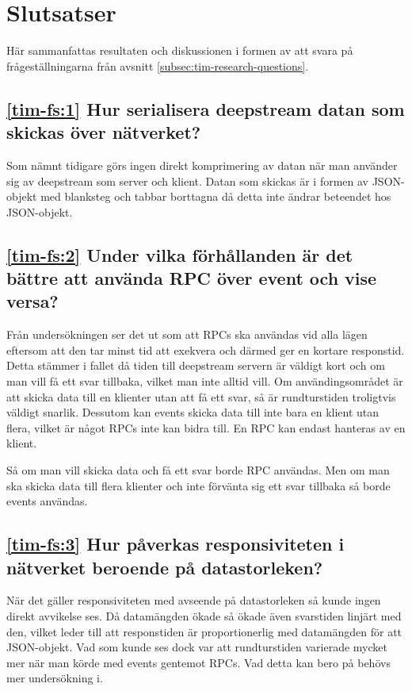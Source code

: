 \section{Slutsatser}
\label{sec:tim-conclusion}
Här sammanfattas resultaten och diskussionen i formen av att svara på frågeställningarna från avsnitt \ref{subsec:tim-research-questions}.

\subsection*{\ref{tim-fs:1} Hur serialisera deepstream datan som skickas över nätverket?}
Som nämnt tidigare görs ingen direkt komprimering av datan när man använder sig av deepstream som server och klient. Datan som skickas är i formen av JSON-objekt med blanksteg och tabbar borttagna då detta inte ändrar beteendet hos JSON-objekt.

\subsection*{\ref{tim-fs:2} Under vilka förhållanden är det bättre att använda RPC över event och vise versa?}
Från undersökningen ser det ut som att RPCs ska användas vid alla lägen eftersom att den tar minst tid att exekvera och därmed ger en kortare responstid. Detta stämmer i fallet då tiden till deepstream servern är väldigt kort och om man vill få ett svar tillbaka, vilket man inte alltid vill. Om användingsområdet är att skicka data till en klienter utan att få ett svar, så är rundturstiden troligtvis väldigt snarlik. Dessutom kan events skicka data till inte bara en klient utan flera, vilket är något RPCs inte kan bidra till. En RPC kan endast hanteras av en klient.

Så om man vill skicka data och få ett svar borde RPC användas. Men om man ska skicka data till flera klienter och inte förvänta sig ett svar tillbaka så borde events användas.

\subsection*{\ref{tim-fs:3} Hur påverkas responsiviteten i nätverket beroende på datastorleken?}
När det gäller responsiviteten med avseende på datastorleken så kunde ingen direkt avvikelse ses. Då datamängden ökade så ökade även svarstiden linjärt med den, vilket leder till att responstiden är proportionerlig med datamängden för att JSON-objekt. Vad som kunde ses dock var att rundturstiden varierade mycket mer när man körde med events gentemot RPCs. Vad detta kan bero på behövs mer undersökning i.
